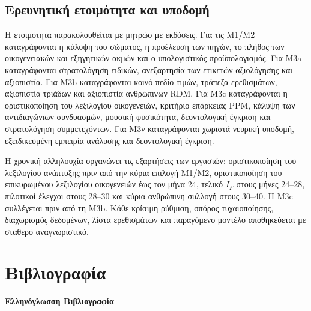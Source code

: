 \documentclass[11pt,a4paper]{article}
\begin{document}
\subsection{Ερευνητική ετοιμότητα και υποδομή}\label{app:impl-readiness}

Η ετοιμότητα παρακολουθείται με μητρώο με εκδόσεις. Για τις M1/M2 καταγράφονται η κάλυψη του σώματος, η προέλευση των πηγών, το πλήθος των οικογενειακών και εξηγητικών ακμών και ο υπολογιστικός προϋπολογισμός. Για M3a καταγράφονται στρατολόγηση ειδικών, ανεξαρτησία των ετικετών αξιολόγησης και αξιοπιστία. Για M3b καταγράφονται κοινό πεδίο τιμών, τράπεζα ερεθισμάτων, αξιοπιστία τριάδων και αξιοπιστία ανθρώπινων RDM. Για M3c καταγράφονται η οριστικοποίηση του λεξιλογίου οικογενειών, κριτήριο επάρκειας PPM, κάλυψη των αντιδιαγώνιων συνδυασμών, μουσική φυσικότητα, δεοντολογική έγκριση και στρατολόγηση συμμετεχόντων. Για M3ν καταγράφονται χωριστά νευρική υποδομή, εξειδικευμένη εμπειρία ανάλυσης και δεοντολογική έγκριση.

Η χρονική αλληλουχία οργανώνει τις εξαρτήσεις των εργασιών: οριστικοποίηση του λεξιλογίου ανάπτυξης πριν από την κύρια επιλογή M1/M2, οριστικοποίηση του επικυρωμένου λεξιλογίου οικογενειών έως τον μήνα 24, τελικό $I_F$ στους μήνες 24--28, πιλοτικοί έλεγχοι στους 28--30 και κύρια ανθρώπινη συλλογή στους 30--40. Η M3c συλλέγεται πριν από τη M3b. Κάθε κρίσιμη ρύθμιση, σπόρος τυχαιοποίησης, διαχωρισμός δεδομένων, λίστα ερεθισμάτων και παραγόμενο μοντέλο αποθηκεύεται με σταθερό αναγνωριστικό.


\begingroup
{}
\section*{Βιβλιογραφία}
\sloppy

\textbf{Ελληνόγλωσση Βιβλιογραφία}
\end{document}
